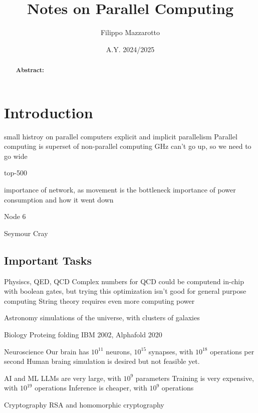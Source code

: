 \documentclass[a4paper]{tufte-handout} %
\title{Notes on Parallel Computing}
\author{Filippo Mazzarotto}
\date{A.Y. 2024/2025} %
\begin{document}
\maketitle %


\begin{abstract}
	\textbf{Abstract:} 
\end{abstract}

\section{Introduction}

small histroy on parallel computers
explicit and implicit parallelism
Parallel computing is superset of non-parallel computing
GHz can't go up, so we need to go wide


top-500 \cite{top500}

importance of network, as movement is the bottleneck
importance of power consumption and how it went down

Node 6

Seymour Cray \cite{crey_seymour}

\subsection{Important Tasks}

Physiscs, QED, QCD
Complex numbers for QCD could be computend in-chip with boolean gates, but trying this optimization isn't good for general purpose computing
String theory requires even more computing power

Astronomy
simulations of the universe, with clusters of galaxies

Biology
Proteing folding IBM 2002\cite{ibm_protein_folding}, Alphafold 2020 \cite{alphafold}

Neuroscience
Our brain has $10^{11}$ neurons, $10^{15}$ synapses, with $10^{18}$ operations per second
Human braing simulation is desired but not feasible yet.

AI and ML
LLMs are very large, with $10^9$ parameters
Training is very expensive, with $10^19$ operations
Inference is cheaper, with $10^9$ operations

Cryptography
RSA \cite{rsa} and homomorphic cryptography \cite{homomorphic_cryptography}
\end{document}
